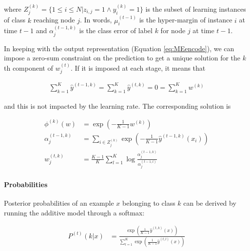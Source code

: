 \documentclass{article}
\begin{document}
where $Z_j^{(k)} = \{1 \leq i \leq N | z_{i,j} = 1 \wedge y_i^{(k)} = 1 \}$ is 
the subset of learning instances of class $k$ reaching node $j$. In words, 
$\mu_i^{(t-1)}$ is the hyper-margin of instance $i$ at time $t-1$ and 
$\alpha_j^{(t-1, k)}$ is the class error of label $k$ for node $j$ at time 
$t-1$.


In keeping with the output representation (Equation \ref{eq:MEencode}), we can 
impose a zero-sum constraint on the prediction to get a unique solution for the 
$k$th component of $w_j^{(t)}$. If it is imposed at each stage, it means that

\vspace*{-\baselineskip}
\begin{align}\label{eq:MEzeroSum}
\sum_{k=1}^{K} \hat{y}^{(t-1, k)} = \sum_{k=1}^{K} 
\hat{y}^{(t, k)} = 0 = \sum_{k=1}^{K} w^{(k)}
\end{align}
\vspace*{-\baselineskip}

and this is not impacted by the learning rate. The corresponding solution is

\vspace*{-\baselineskip}
\begin{align}
\phi^{(k)}(w) &= \exp \left(-\frac{1}{K-1} w^{(k)}\right)\\ 
\label{eq:MEClsErrZS}
\alpha_j^{(t-1, k)} &= \sum_{i \in Z_j^{(k)}} \exp \left( -\frac{1}{K-1} 
\hat{y}^{(t-1, k)}(x_i) \right) \\ \label{eq:MEsolution}
w_j^{(t,k)} &= \frac{K-1}{K}  \sum_{l=1}^{K} \log \frac{\alpha_j^{(t-1, 
k)}}{\alpha_j^{(t-1, l)}} 
\end{align}
\vspace*{-\baselineskip}

\paragraph{Probabilities}
Posterior probabilities of an example $x$ belonging to class $k$ can be derived 
by running the additive model through a softmax:

\vspace*{-\baselineskip}
\begin{align}\label{eq:MEproba}
P^{(t)}(k|x) &= \frac{\exp \left(\frac{1}{K-1} \hat{y}^{(t, k)}(x) 
\right)}{\sum_{l=1}^K\exp \left(\frac{1}{K-1} \hat{y}^{(t, l)}(x) \right)}
\end{align}
\vspace*{-\baselineskip}
\end{document}

